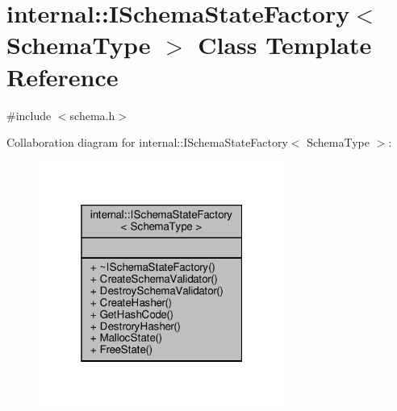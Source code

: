 \hypertarget{classinternal_1_1ISchemaStateFactory}{}\section{internal\+:\+:I\+Schema\+State\+Factory$<$ Schema\+Type $>$ Class Template Reference}
\label{classinternal_1_1ISchemaStateFactory}


{\ttfamily \#include $<$schema.\+h$>$}



Collaboration diagram for internal\+:\+:I\+Schema\+State\+Factory$<$ Schema\+Type $>$\+:
\nopagebreak
\begin{figure}[H]
\begin{center}
\leavevmode
\includegraphics[width=229pt]{classinternal_1_1ISchemaStateFactory__coll__graph}
\end{center}
\end{figure}
